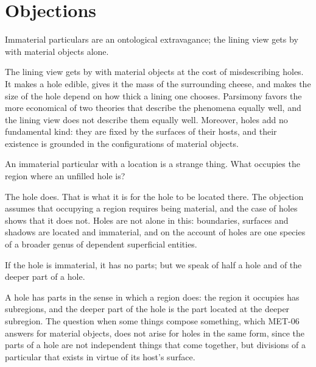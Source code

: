 \documentclass{situationist-preprint}
\begin{document}
\section{Objections}

\begin{objection}[Parsimony]
Immaterial particulars are an ontological extravagance; the lining view gets by with material objects alone.
\end{objection}

\begin{reply}
The lining view gets by with material objects at the cost of misdescribing holes. It makes a hole edible, gives it the mass of the surrounding cheese, and makes the size of the hole depend on how thick a lining one chooses. Parsimony favors the more economical of two theories that describe the phenomena equally well, and the lining view does not describe them equally well. Moreover, holes add no fundamental kind: they are fixed by the surfaces of their hosts, and their existence is grounded in the configurations of material objects.
\end{reply}

\begin{objection}[Location]
An immaterial particular with a location is a strange thing. What occupies the region where an unfilled hole is?
\end{objection}

\begin{reply}
The hole does. That is what it is for the hole to be located there. The objection assumes that occupying a region requires being material, and the case of holes shows that it does not. Holes are not alone in this: boundaries, surfaces and shadows are located and immaterial, and on the account of \citet{CasatiVarzi1994} holes are one species of a broader genus of dependent superficial entities.
\end{reply}

\begin{objection}[Composition]
If the hole is immaterial, it has no parts; but we speak of half a hole and of the deeper part of a hole.
\end{objection}

\begin{reply}
A hole has parts in the sense in which a region does: the region it occupies has subregions, and the deeper part of the hole is the part located at the deeper subregion. The question when some things compose something, which MET-06 answers for material objects, does not arise for holes in the same form, since the parts of a hole are not independent things that come together, but divisions of a particular that exists in virtue of its host's surface.
\end{reply}
\end{document}
